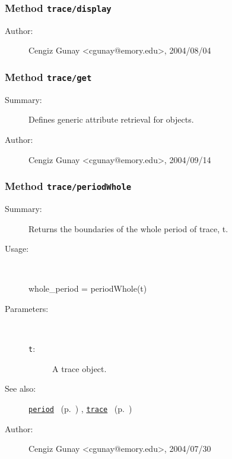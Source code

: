 \subsubsection[Method \texttt{display}]{Method \texttt{trace/display}}%
%
\label{ref_trace__display}%
\hypertarget{ref_trace__display}{}%
\begin{description}
%
%
%
%
%
%
%
\item[Author:]%
Cengiz Gunay <cgunay@emory.edu>, 2004/08/04%
\end{description}
\methodline%
\subsubsection[Method \texttt{get}]{Method \texttt{trace/get}}%
%
\label{ref_trace__get}%
\hypertarget{ref_trace__get}{}%
\begin{description}
\item[Summary:]Defines generic attribute retrieval for objects.
%
%
%
%
%
%
%
\item[Author:]%
Cengiz Gunay <cgunay@emory.edu>, 2004/09/14%
\end{description}
\methodline%
\subsubsection[Method \texttt{periodWhole}]{Method \texttt{trace/periodWhole}}%
%
\label{ref_trace__periodWhole}%
\hypertarget{ref_trace__periodWhole}{}%
\begin{description}
\item[Summary:]Returns the boundaries of the whole period of trace, t. 
%
\item[Usage:]~%
\begin{lyxcode}%
whole\_period = periodWhole(t)
%
\end{lyxcode}%
%
%
\item[Parameters:]~
\begin{description}%
\item[\texttt{t}:]
 A trace object.
\end{description}%
%
%
%
\item[See also:]%
\hyperlink{ref_period}{\texttt{period}}%
\ (p.~\pageref{ref_period})%
%
, \hyperlink{ref_trace}{\texttt{trace}}%
\ (p.~\pageref{ref_trace})%
%
%
\item[Author:]%
Cengiz Gunay <cgunay@emory.edu>, 2004/07/30%
\end{description}
\methodline%
